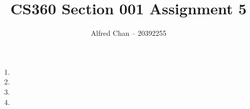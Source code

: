 \documentclass[12pt]{article}
\title{CS360 Section 001 Assignment 5}
\author{Alfred Chan -- 20392255}
\begin{document}
\maketitle

\begin{enumerate}
\item
\item
\item
\item
\end{enumerate}
\end{document}

